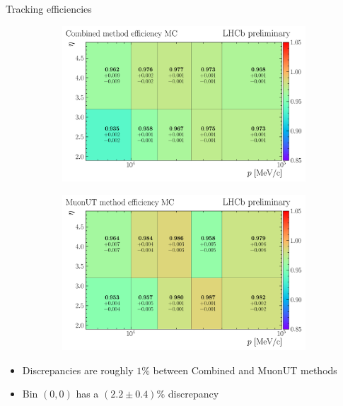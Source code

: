 \documentclass[xcolor={dvipsnames}]{beamer}
\begin{document}
\begin{frame}{Tracking efficiencies}
  \vspace{0.0cm}
  \begin{figure}[htb]
    \centering
    \begin{subfigure}{0.5\textwidth}
      \centering
      \includegraphics[width=1.0\textwidth]{Plots/trackEff_MC_Sim10d_2024_Block1_Combined_P-ETA.png}
    \end{subfigure}%
    \begin{subfigure}{0.5\textwidth}
      \centering
      \includegraphics[width=1.0\textwidth]{Plots/trackEff_MC_Sim10d_2024_Block1_MuonUT_P-ETA.png}
    \end{subfigure}
  \end{figure}
  \begin{itemize}
    \item{Discrepancies are roughly $1\%$ between Combined and MuonUT methods}
    \item{Bin $(0, 0)$ has a $(2.2 \pm 0.4)\%$ discrepancy}
  \end{itemize}
\end{frame}
\end{document}
